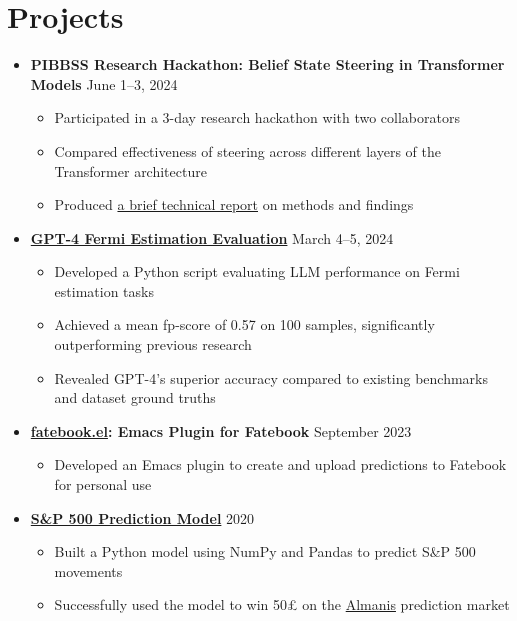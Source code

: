 \documentclass[letterpaper,10pt]{article}
\begin{document}
\section*{Projects}
  \begin{itemize}
    \item \textbf{PIBBSS Research Hackathon: Belief State Steering in Transformer Models} \hfill June 1--3, 2024
    \begin{itemize}
        \item Participated in a 3-day research hackathon with two collaborators
        \item Compared effectiveness of steering across  different layers of the Transformer architecture
        \item Produced \href{https://github.com/sonofhypnos/CV/blob/main/steering-models-belief-states.pdf}{a brief technical report} on methods and findings
    \end{itemize}
    \item \textbf{\href{https://github.com/sonofhypnos/fermi}{GPT-4 Fermi Estimation Evaluation}} \hfill March 4--5, 2024
    \begin{itemize}
      \item Developed a Python script evaluating LLM performance on Fermi estimation tasks
      \item Achieved a mean fp-score of 0.57 on 100 samples, significantly outperforming previous research
      \item Revealed GPT-4's superior accuracy compared to existing benchmarks and dataset ground truths
    \end{itemize}
    \item \textbf{\href{https://github.com/sonofhypnos/fatebook.el}{fatebook.el}: Emacs Plugin for Fatebook} \hfill September 2023
    \begin{itemize}
        \item Developed an Emacs plugin to create and upload predictions to Fatebook for personal use
    \end{itemize}
    \item \textbf{\href{https://sonofhypnos.github.io/blog/prediction/python/2021/01/30/sp500.html}{S\&P 500 Prediction Model}} \hfill 2020
    \begin{itemize}
        \item Built a Python model using NumPy and Pandas to predict S\&P 500 movements
        \item Successfully used the model to win 50£ on the \href{https://www.almanisprivate.com/}{Almanis} prediction market
    \end{itemize}
  \end{itemize}
\end{document}
